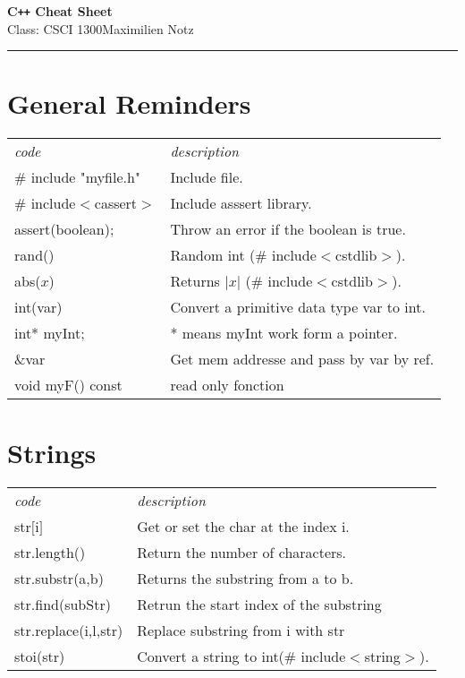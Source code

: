 \documentclass[5pt]{article}
\begin{document}
\begin{center}
     \Large{\textbf{C\texttt{++} Cheat Sheet}}\\
     \small{Class: CSCI 1300}\hfill\small{\textcopyright Maximilien Notz \the\year{}}
     \noindent\rule{20cm}{0.4pt}
\end{center}
\begin{multicols}{2}
\setcounter{secnumdepth}{0}


\section{General Reminders}
\begin{tabular}{ll}
\emph{code}             & \emph{description}\\
\# include "myfile.h"   & Include file.\\
\# include$<$cassert$>$ & Include asssert library.\\
assert(boolean);        & Throw an error if the boolean is true.\\
rand()                  & Random int (\# include$<$cstdlib$>$).\\
abs($x$)                & Returns $|x|$ (\# include$<$cstdlib$>$).\\
int(var)                & Convert a primitive data type var to int.\\
int* myInt;             & * means myInt work form a pointer.\\
\&var                   & Get mem addresse and pass by var by ref.\\
void myF() const        & read only fonction\\
\end{tabular}


\section{Strings}
\begin{tabular}{ll}
\emph{code}         & \emph{description}\\
str$[$i$]$          & Get or set the char at the index i.\\
str.length()        & Return the number of characters.\\
str.substr(a,b)     & Returns the substring from a to b.\\
str.find(subStr)    & Retrun the start index of the substring\\
str.replace(i,l,str)& Replace substring from i with str\\
stoi(str)           & Convert a string to int(\# include$<$string$>$).
\end{tabular}


\end{multicols}
\end{document}
